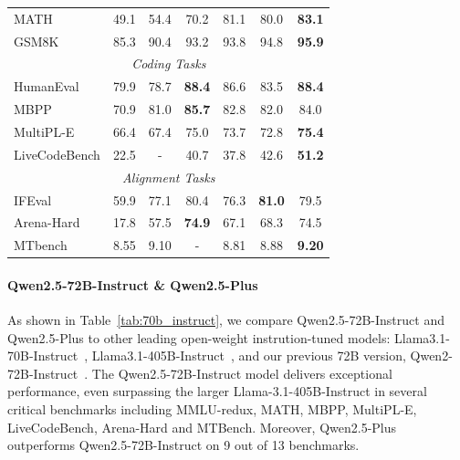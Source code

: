 \documentclass{article}
\begin{document}
\begin{table}[tbp]
\begin{tabular}{@{}lcccccc@{}}
MATH & 49.1 & 54.4 & 70.2 & 81.1 & 80.0 & \textbf{83.1} \\

GSM8K & 85.3 & 90.4 & 93.2 & 93.8 & 94.8 & \textbf{95.9} \\

\midrule

\multicolumn{7}{c}{\textit{Coding Tasks}} \\

\midrule

HumanEval & 79.9 & 78.7 & \textbf{88.4} & 86.6 & 83.5 & \textbf{88.4} \\

MBPP & 70.9 & 81.0 & \textbf{85.7} & 82.8 & 82.0 & 84.0 \\

MultiPL-E & 66.4 & 67.4 & 75.0 & 73.7 & 72.8 & \textbf{75.4} \\

LiveCodeBench & 22.5 & - & 40.7 & 37.8 & 42.6 & \textbf{51.2} \\

\midrule

\multicolumn{7}{c}{\textit{Alignment Tasks}} \\

\midrule

IFEval & 59.9 & 77.1 & 80.4 & 76.3 & \textbf{81.0} & 79.5 \\

Arena-Hard & 17.8 & 57.5 & \textbf{74.9} & 67.1 & 68.3 & 74.5 \\

MTbench & 8.55 & 9.10 & - & 8.81 & 8.88 & \textbf{9.20} \\

\bottomrule

\end{tabular}

\end{table}

\paragraph{Qwen2.5-72B-Instruct \& Qwen2.5-Plus} 
As shown in Table~\ref{tab:70b_instruct}, we compare Qwen2.5-72B-Instruct and Qwen2.5-Plus to other leading open-weight instrution-tuned models: Llama3.1-70B-Instruct~\citep{llama3}, Llama3.1-405B-Instruct~\citep{llama3}, and our previous 72B version, Qwen2-72B-Instruct~\citep{qwen2}. 
The Qwen2.5-72B-Instruct model delivers exceptional performance, even surpassing the larger Llama-3.1-405B-Instruct in several critical benchmarks including MMLU-redux, MATH, MBPP, MultiPL-E, LiveCodeBench, Arena-Hard and MTBench.
Moreover, Qwen2.5-Plus outperforms Qwen2.5-72B-Instruct on 9 out of 13 benchmarks.
\end{document}
